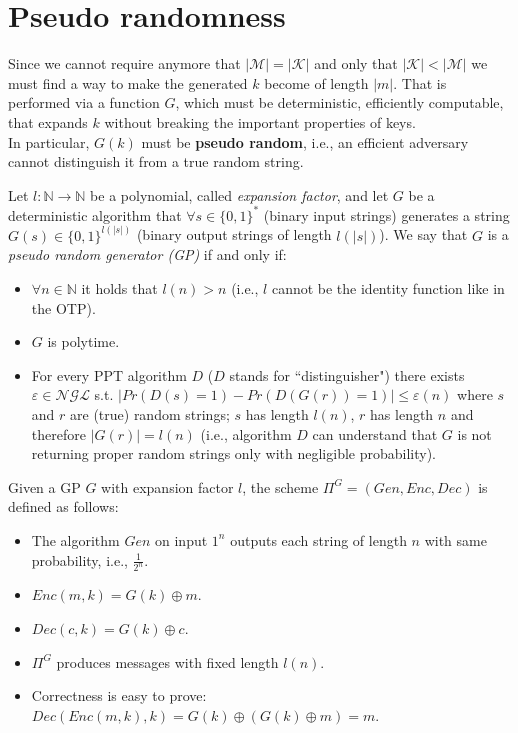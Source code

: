 \documentclass[../main]{subfiles}
\begin{document}
\section{Pseudo randomness}
Since we cannot require anymore that $|\mathcal{M}| = |\mathcal{K}|$ and only that $|\mathcal{K}| < |\mathcal{M}|$ we must find a way to make the generated $k$ become of length $|m|$.
That is performed via a function $G$, which must be deterministic, efficiently computable, that expands $k$ without breaking the important properties of keys.\\
In particular, $G(k)$ must be \textbf{pseudo random}, i.e., an efficient adversary cannot distinguish it from a true random string.

\begin{definition}
    Let $l:\mathbb{N}\rightarrow{}\mathbb{N}$ be a polynomial, called \textit{expansion factor}, and let $G$ be a deterministic algorithm that $\forall{} s \in{} \{0,1\}^*$ (binary input strings) generates a string $G(s) \in{} \{0,1\}^{l(|s|)}$ (binary output strings of length $l(|s|)$).
    We say that $G$ is a \textit{pseudo random generator (GP)} if and only if:
    \begin{itemize}
        \item $\forall{}n \in{} \mathbb{N}$ it holds that $l(n) > n$ (i.e., $l$ cannot be the identity function like in the OTP).
        \item $G$ is polytime.
        \item For every PPT algorithm $D$ ($D$ stands for ``distinguisher") there exists $\varepsilon{} \in{} \mathcal{NGL}$ s.t. $|Pr(D(s) = 1) - Pr(D(G(r)) = 1)| \le{} \varepsilon(n)$ where $s$ and $r$ are (true) random strings; $s$ has length $l(n)$, $r$ has length $n$ and therefore $|G(r)|=l(n)$ (i.e., algorithm $D$ can understand that $G$ is not returning proper random strings only with negligible probability).
    \end{itemize}
\end{definition}

\begin{definition}
    Given a GP $G$ with expansion factor $l$, the scheme $\Pi^G = (Gen,Enc,Dec)$ is defined as follows:
    \begin{itemize}
        \item The algorithm $Gen$ on input $1^n$ outputs each string of length $n$ with same probability, i.e., $\frac{1}{2^n}$.
        \item $Enc(m,k)=G(k)\oplus{}m$.
        \item $Dec(c,k)=G(k)\oplus{}c$.
        \item $\Pi^G$ produces messages with fixed length $l(n)$.
        \item Correctness is easy to prove: $Dec(Enc(m,k),k)=G(k)\oplus(G(k)\oplus m)=m$.
    \end{itemize}
\end{definition}
\end{document}

